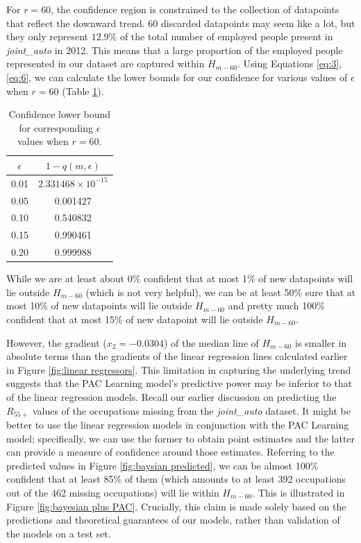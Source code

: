 \documentclass[11pt]{article}
\begin{document}
For $r=60$, the confidence region is constrained to the collection of datapoints that reflect the downward trend. 60 discarded datapoints may seem like a lot, but they only represent $12.9\%$ of the total number of employed people present in \emph{joint\_auto} in 2012. This means that a large proportion of the employed people represented in our dataset are captured within $H_{m-60}$. Using Equations \ref{eq:3},\ref{eq:6}, we can calculate the lower bounds for our confidence for various values of $\epsilon$ when $r=60$ (Table \ref{tab:confidence2}).


\begin{table}[]
\centering
\begin{tabular}{@{}cc@{}}
\toprule
\textbf{$\epsilon$} & \textbf{$1-q(m,\epsilon)$} \\ \midrule
0.01             & $2.331468\times10^{-15}$               \\
0.05             & 0.001427               \\
0.10             & 0.540832 \\ 
0.15             & 0.990461 \\ 
0.20             & 0.999988  \\ \bottomrule
\end{tabular}
\caption{Confidence lower bound for corresponding $\epsilon$ values when $r=60$.}
\label{tab:confidence2}
\end{table}



While we are at least about 0\% confident that at most 1\% of new datapoints will lie outside $H_{m-60}$ (which is not very helpful), we can be at least 50\% sure that at most 10\% of new datapoints will lie outside $H_{m-60}$ and pretty much 100\% confident that at most 15\% of new datapoint will lie outside $H_{m-60}$.

However, the gradient ($x_{2}=-0.0304$) of the median line of $H_{m-60}$ is smaller in absolute terms than the gradients of the linear regression lines calculated earlier in Figure \ref{fig:linear regressors}. This limitation in capturing the underlying trend suggests that the PAC Learning model's predictive power may be inferior to that of the linear regression models. Recall our earlier discussion on predicting the $R_{55+}$ values of the occupations missing from the \emph{joint\_auto} dataset. It might be better to use the linear regression models in conjunction with the PAC Learning model; specifically, we can use the former to obtain point estimates and the latter can provide a measure of confidence around those estimates. Referring to the predicted values in Figure \ref{fig:baysian predicted}, we can be almost 100\% confident that at least 85\% of them (which amounts to at least 392 occupations out of the 462 missing occupations) will lie within $H_{m-60}$. This is illustrated in Figure \ref{fig:bayesian plus PAC}. Crucially, this claim is made solely based on the predictions and theoretical guarantees of our models, rather than validation of the models on a test set.
\end{document}
